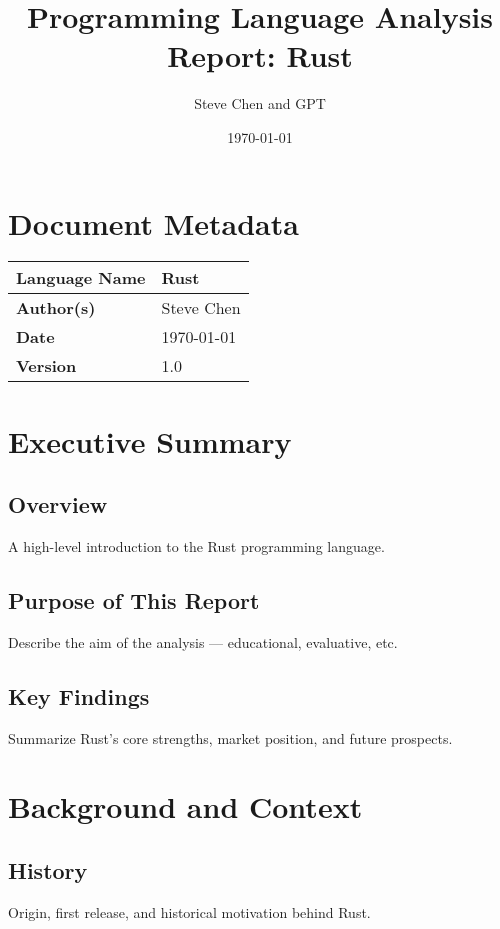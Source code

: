 \documentclass[a4paper,12pt]{article}
\title{Programming Language Analysis Report: Rust}
\author{Steve Chen and GPT}
\date{\today}
\begin{document}
\maketitle
\tableofcontents
\newpage

\section*{Document Metadata}

\begin{tabular}{|l|p{10cm}|}
\hline
\textbf{Language Name} & Rust \\
\hline
\textbf{Author(s)} & Steve Chen \\
\hline
\textbf{Date} & \today \\
\hline
\textbf{Version} & 1.0 \\
\hline
\end{tabular}

\section{Executive Summary}

\subsection{Overview}
A high-level introduction to the Rust programming language.

\subsection{Purpose of This Report}
Describe the aim of the analysis — educational, evaluative, etc.

\subsection{Key Findings}
Summarize Rust’s core strengths, market position, and future prospects.

\section{Background and Context}

\subsection{History}
Origin, first release, and historical motivation behind Rust.
\end{document}
